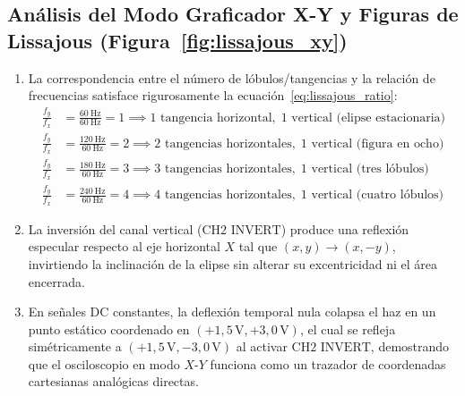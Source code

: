 \subsection{Análisis del Modo Graficador X-Y y Figuras de Lissajous (Figura~\ref{fig:lissajous_xy})}
\begin{enumerate}
    \item La correspondencia entre el número de lóbulos/tangencias y la relación de frecuencias satisface rigurosamente la ecuación~\eqref{eq:lissajous_ratio}:
    \begin{align}
        \frac{f_y}{f_x} &= \frac{\qty{60}{\hertz}}{\qty{60}{\hertz}} = 1 \implies 1\text{ tangencia horizontal},\; 1\text{ vertical (elipse estacionaria)} \\
        \frac{f_y}{f_x} &= \frac{\qty{120}{\hertz}}{\qty{60}{\hertz}} = 2 \implies 2\text{ tangencias horizontales},\; 1\text{ vertical (figura en ocho)} \\
        \frac{f_y}{f_x} &= \frac{\qty{180}{\hertz}}{\qty{60}{\hertz}} = 3 \implies 3\text{ tangencias horizontales},\; 1\text{ vertical (tres lóbulos)} \\
        \frac{f_y}{f_x} &= \frac{\qty{240}{\hertz}}{\qty{60}{\hertz}} = 4 \implies 4\text{ tangencias horizontales},\; 1\text{ vertical (cuatro lóbulos)}
    \end{align}
    \item La inversión del canal vertical ($\text{CH2 INVERT}$) produce una reflexión especular respecto al eje horizontal $X$ tal que $(x, y) \to (x, -y)$, invirtiendo la inclinación de la elipse sin alterar su excentricidad ni el área encerrada.
    \item En señales DC constantes, la deflexión temporal nula colapsa el haz en un punto estático coordenado en $(+1{,}5\,\unit{\volt}, +3{,}0\,\unit{\volt})$, el cual se refleja simétricamente a $(+1{,}5\,\unit{\volt}, -3{,}0\,\unit{\volt})$ al activar $\text{CH2 INVERT}$, demostrando que el osciloscopio en modo $X$-$Y$ funciona como un trazador de coordenadas cartesianas analógicas directas.
\end{enumerate}
